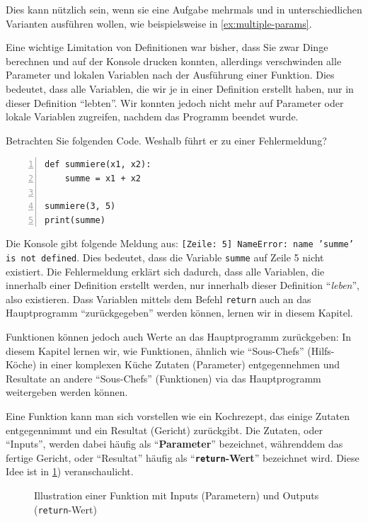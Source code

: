 Dies kann nützlich sein, wenn sie eine Aufgabe mehrmals und in unterschiedlichen Varianten ausführen wollen, wie beispielsweise in \cref{ex:multiple-params}.

Eine wichtige Limitation von Definitionen war bisher, dass Sie zwar Dinge berechnen und auf der Konsole drucken konnten, allerdings verschwinden alle Parameter und lokalen Variablen nach der Ausführung einer Funktion.  Dies bedeutet, dass alle Variablen, die wir je in einer Definition erstellt haben, nur in dieser Definition \enquote{lebten}. Wir konnten jedoch nicht mehr auf Parameter oder lokale Variablen zugreifen, nachdem das Programm beendet wurde.

\begin{myexample}\label{ex:sum-noreturn}
Betrachten Sie folgenden Code. Weshalb führt er zu einer Fehlermeldung?
\begin{lstlisting}[numbers=left]
def summiere(x1, x2):
    summe = x1 + x2
    
summiere(3, 5)
print(summe)
\end{lstlisting}
Die Konsole gibt folgende Meldung aus: \texttt{[Zeile: 5] NameError: name 'summe' is not defined}. Dies bedeutet, dass die Variable \lstinline|summe| auf Zeile 5 nicht existiert. Die Fehlermeldung erklärt sich dadurch, dass alle Variablen, die innerhalb einer Definition erstellt werden, nur innerhalb dieser Definition \enquote{\textit{leben}}, also existieren. Dass Variablen mittels dem Befehl \lstinline|return| auch an das Hauptprogramm \enquote{zurückgegeben} werden können, lernen wir in diesem Kapitel.
\end{myexample}


Funktionen können jedoch auch Werte an das Hauptprogramm zurückgeben: In diesem Kapitel lernen wir, wie Funktionen, ähnlich wie \enquote{Sous-Chefs} (Hilfs-Köche) in einer komplexen Küche Zutaten (Parameter) entgegennehmen und Resultate an andere \enquote{Sous-Chefs} (Funktionen) via das Hauptprogramm weitergeben werden können.

Eine Funktion kann man sich vorstellen wie ein Kochrezept, das einige Zutaten entgegennimmt und ein Resultat (Gericht) zurückgibt. Die Zutaten, oder \enquote{Inputs}, werden dabei häufig als \enquote{\textbf{Parameter}} bezeichnet, währenddem das fertige Gericht, oder \enquote{Resultat} häufig als \enquote{\textbf{\lstinline|return|-Wert}} bezeichnet wird. Diese Idee ist in \cref{fig:funktion-einzeln}) veranschaulicht.

\begin{figure}[H]
	\centering
	\caption{Illustration einer Funktion mit Inputs (Parametern) und Outputs (\lstinline|return|-Wert)}
	\label{fig:funktion-einzeln}
\end{figure}

